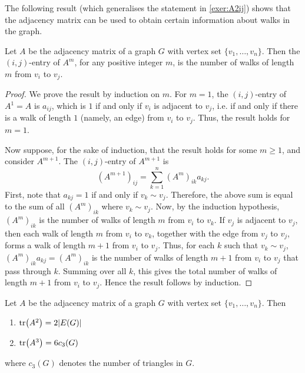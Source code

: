 The following result (which generalises the statement in \cref{exer:A2ij}) shows that the adjacency matrix can be used to obtain certain information about walks in the graph.

\begin{Theorem}
Let $A$ be the adjacency matrix of a graph $G$ with vertex set $\{v_1, \ldots, v_n\}$. Then the $(i,j)$-entry of $A^m$, for any positive integer $m$, is the number of walks of length $m$ from $v_i$ to $v_j$.
\end{Theorem}

\begin{proof}
We prove the result by induction on $m$. For $m = 1$, the $(i,j)$-entry of $A^1 = A$ is $a_{ij}$, which is $1$ if and only if $v_i$ is adjacent to $v_j$, i.e. if and only if there is a walk of length $1$ (namely, an edge) from $v_i$ to $v_j$. Thus, the result holds for $m = 1$.

Now suppose, for the sake of induction, that the result holds for some $m \ge 1$, and consider $A^{m + 1}$. The $(i,j)$-entry of $A^{m + 1}$ is
\begin{equation*}
(A^{m + 1})_{ij} = \sum_{k = 1}^{n} (A^m)_{ik} a_{kj}.
\end{equation*}
First, note that $a_{kj} = 1$ if and only if $v_k \sim v_j$. Therefore, the above sum is equal to the sum of all $(A^m)_{ik}$ where $v_k \sim v_j$. Now, by the induction hypothesis, $(A^m)_{ik}$ is the number of walks of length $m$ from $v_i$ to $v_k$. If $v_j$ is adjacent to $v_j$, then each walk of length $m$ from $v_i$ to $v_k$, together with the edge from $v_j$ to $v_j$, forms a walk of length $m + 1$ from $v_i$ to $v_j$. Thus, for each $k$ such that $v_k \sim v_j$, $(A^m)_{ik} a_{kj} = (A^m)_{ik}$ is the number of walks of length $m + 1$ from $v_i$ to $v_j$ that pass through $k$. Summing over all $k$, this gives the total number of walks of length $m + 1$ from $v_i$ to $v_j$. Hence the result follows by induction.
\end{proof}

\begin{Theorem}
Let $A$ be the adjacency matrix of a graph $G$ with vertex set $\{v_1, \ldots, v_n\}$. Then
\begin{enumerate}[label=(\roman*)]
\item $\tr(A^2) = 2 |E(G)|$
\item $\tr(A^3) = 6 c_3(G)$
\end{enumerate}
where $c_3(G)$ denotes the number of triangles in $G$.
\end{Theorem}

